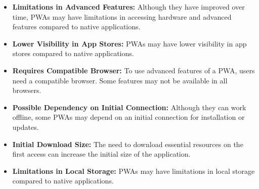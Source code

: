 \documentclass[]{article}
\begin{document}
	\begin{itemize}
		\item \textbf{Limitations in Advanced Features:} Although they have improved over time, PWAs may have limitations in accessing hardware and advanced features compared to native applications.
		
		\item \textbf{Lower Visibility in App Stores:} PWAs may have lower visibility in app stores compared to native applications.
		
		\item \textbf{Requires Compatible Browser:} To use advanced features of a PWA, users need a compatible browser. Some features may not be available in all browsers.
		
		\item \textbf{Possible Dependency on Initial Connection:} Although they can work offline, some PWAs may depend on an initial connection for installation or updates.
		
		\item \textbf{Initial Download Size:} The need to download essential resources on the first access can increase the initial size of the application.
		
		\item \textbf{Limitations in Local Storage:} PWAs may have limitations in local storage compared to native applications.
	\end{itemize}
	\pagebreak
\end{document}
